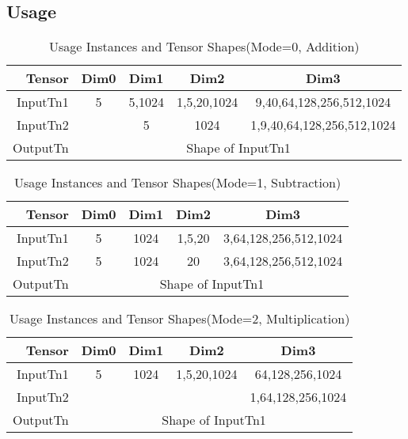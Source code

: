 \subsection{Usage}


\begin{table}[h]
\caption{Usage Instances and Tensor Shapes(Mode=0, Addition)}
\label{tab:shapes_matops0}
	\begin{center}
		\begin{tabular}{|r|c|c|c|c|} 
		\hline	
		Tensor  & Dim0 & Dim1 & Dim2 & Dim3\\ 
		\hline	
		InputTn1 &
			5 &
			5,1024 &
			1,5,20,1024 &
			9,40,64,128,256,512,1024\\
		\hline	
		InputTn2 &
			 &
			5 &
			1024 &
			1,9,40,64,128,256,512,1024\\	
		\hline
		OutputTn &
			\multicolumn{4}{|c|}{Shape of InputTn1} \\
		\hline
		\end{tabular}
	\end{center}
\end{table}

\begin{table}[h]
\caption{Usage Instances and Tensor Shapes(Mode=1, Subtraction)}
\label{tab:shapes_matops1}
	\begin{center}
		\begin{tabular}{|r|c|c|c|c|} 
		\hline	
		Tensor  & Dim0 & Dim1 & Dim2 & Dim3\\ 
		\hline	
		InputTn1 &
			5 &
			1024 &
			1,5,20 &
			3,64,128,256,512,1024\\
		\hline	
		InputTn2 &
			5 &
			1024 &
			20 &
			3,64,128,256,512,1024\\	
		\hline
		OutputTn &
			\multicolumn{4}{|c|}{Shape of InputTn1} \\
		\hline
		\end{tabular}
	\end{center}
\end{table}

\begin{table}[h]
\caption{Usage Instances and Tensor Shapes(Mode=2, Multiplication)}
\label{tab:shapes_matops2}
	\begin{center}
		\begin{tabular}{|r|c|c|c|c|} 
		\hline	
		Tensor  & Dim0 & Dim1 & Dim2 & Dim3\\ 
		\hline	
		InputTn1 &
			5 &
			1024 &
			1,5,20,1024 &
			64,128,256,1024\\
		\hline	
		InputTn2 &
			 &
			 &
			 &
			1,64,128,256,1024\\	
		\hline
		OutputTn &
			\multicolumn{4}{|c|}{Shape of InputTn1} \\
		\hline
		\end{tabular}
	\end{center}
\end{table}

